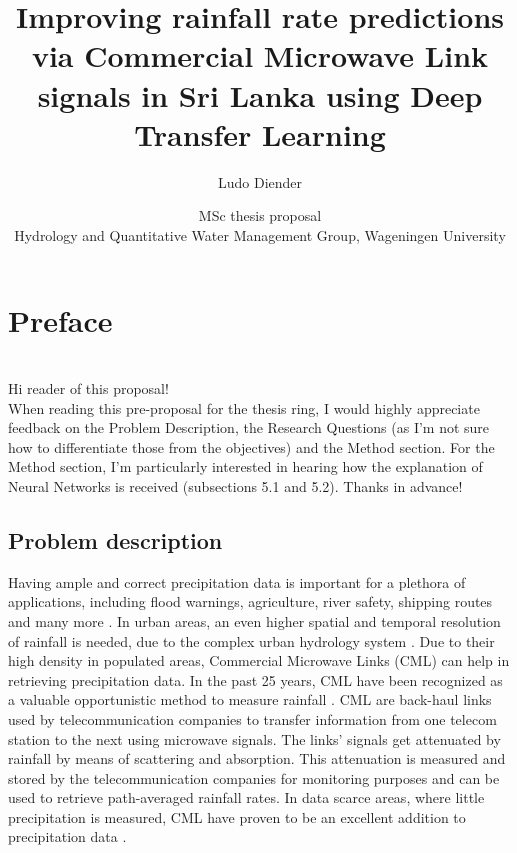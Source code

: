 \documentclass[twocolumn, 10pt, a4paper]{article}
\begin{document}
	\chapter{\textbf{Preface}}
	\\
	Hi reader of this proposal!\\	
	When reading this pre-proposal for the thesis ring, I would highly appreciate feedback on the Problem Description, the Research Questions (as I'm not sure how to differentiate those from the objectives) and the Method section. For the Method section, I'm particularly interested in hearing how the explanation of Neural Networks is received (subsections 5.1 and 5.2). Thanks in advance!
	
	\title{\vspace{-1cm}\Huge{Improving rainfall rate predictions via Commercial Microwave Link signals in Sri Lanka using Deep Transfer Learning}}
	\author{\Large{Ludo Diender}}
	\date{\normalsize{MSc thesis proposal\\
			Hydrology and Quantitative Water Management Group,
			Wageningen University}}
	
	\maketitle
	
	\section{Problem description}
	
	Having ample and correct precipitation data is important for a plethora of applications, including flood warnings, agriculture, river safety, shipping routes and many more \cite{Chwala2019}. In urban areas, an even higher spatial and temporal resolution of rainfall is needed, due to the complex urban hydrology system \cite{Overeem2011}. Due to their high density in populated areas, Commercial Microwave Links (CML) can help in retrieving precipitation data. In the past 25 years, CML have been recognized as a valuable opportunistic method to measure rainfall \cite{Leijnse2007} \cite{Ruf1996}. CML are back-haul links used by telecommunication companies to transfer information from one telecom station to the next using microwave signals. The links' signals get attenuated by rainfall by means of scattering and absorption. This attenuation is measured and stored by the telecommunication companies for monitoring purposes and can be used to retrieve path-averaged rainfall rates. In data scarce areas, where little precipitation is measured, CML have proven to be an excellent addition to precipitation data \cite{Overeem2021,Doumounia2014,Diba2021}.   
	
\end{document}
